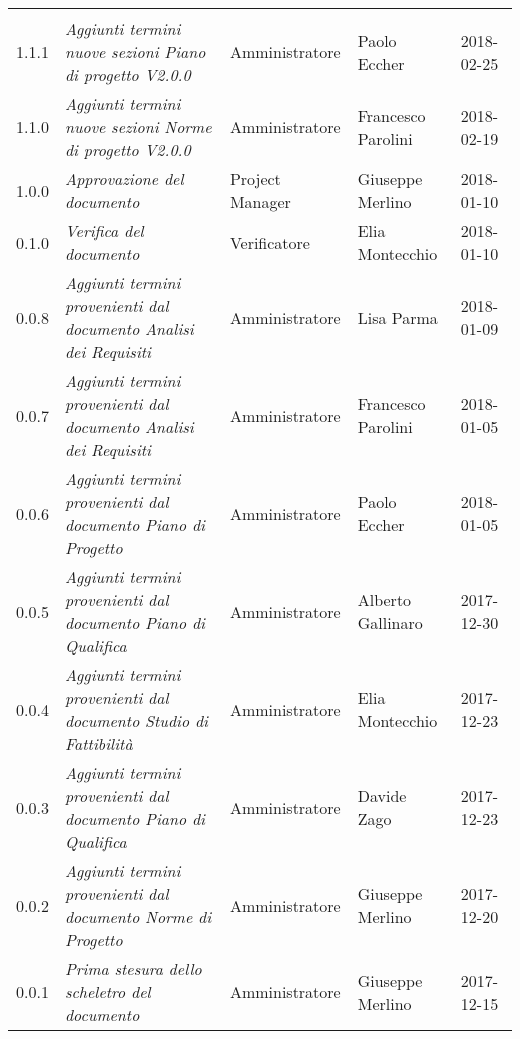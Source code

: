 \newpage 
\section*{}
\begin{table}[H]
	\centering
	\begin{tabular}{p{2cm}|C{4cm}|C{3cm}|R{3cm}|R{2cm}}
		
		  &  & &  & \\
		
		1.1.1 & \emph{Aggiunti termini nuove sezioni Piano di progetto V2.0.0} & Amministratore & Paolo Eccher & 2018-02-25  \\
		\hline
		
		1.1.0 & \emph{Aggiunti termini nuove sezioni Norme di progetto V2.0.0} & Amministratore & Francesco Parolini & 2018-02-19  \\
		\hline
		
		1.0.0 & \emph{Approvazione del documento} & Project Manager & Giuseppe Merlino & 2018-01-10  \\
		\hline
		
		0.1.0 & \emph{Verifica del documento} & Verificatore & Elia Montecchio  & 2018-01-10 \\
		\hline
		
		0.0.8 & \emph{Aggiunti termini provenienti dal documento Analisi dei Requisiti} & Amministratore  & Lisa Parma & 2018-01-09 \\
		\hline
		
		0.0.7 & \emph{Aggiunti termini provenienti dal documento Analisi dei Requisiti} & Amministratore & Francesco Parolini & 2018-01-05 \\
		\hline
		
		0.0.6 & \emph{Aggiunti termini provenienti dal documento Piano di Progetto} & Amministratore & Paolo Eccher & 2018-01-05  \\
		\hline
		
		0.0.5 & \emph{Aggiunti termini provenienti dal documento Piano di Qualifica} & Amministratore & Alberto Gallinaro & 2017-12-30 \\
		\hline
		
		0.0.4 & \emph{Aggiunti termini provenienti dal documento Studio di Fattibilità} & Amministratore & Elia Montecchio & 2017-12-23 \\
		\hline
		
		0.0.3 & \emph{Aggiunti termini provenienti dal documento Piano di Qualifica}  & Amministratore & Davide Zago & 2017-12-23 \\
		\hline
		
		0.0.2 & \emph{Aggiunti termini provenienti dal documento Norme di Progetto}  & Amministratore & Giuseppe Merlino & 2017-12-20 \\
		\hline
		
		0.0.1 & \emph{Prima stesura dello scheletro del documento} & Amministratore  & Giuseppe Merlino & 2017-12-15   \\
		
	\end{tabular}
	
\end{table}


\clearpage